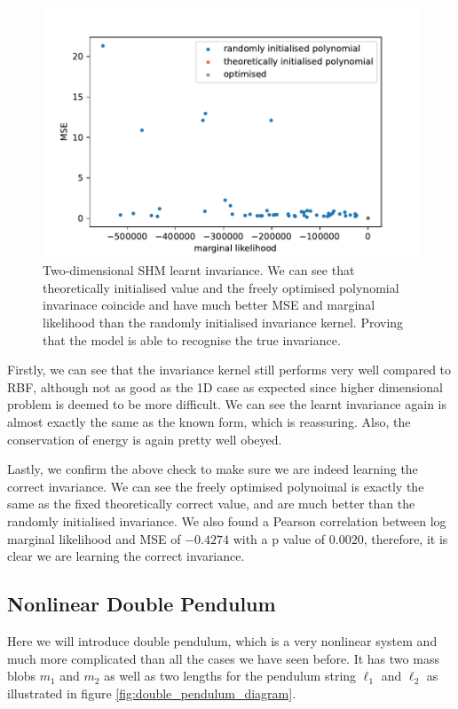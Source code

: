 \documentclass{statsmsc}
\begin{document}
\begin{figure}[H] 
  \includegraphics[width=0.8\linewidth]{../codes/figures/shm_2d_polynomial.pdf}
  \centering
  \caption{Two-dimensional SHM learnt invariance. We can see that theoretically initialised value and the freely optimised polynomial invarinace coincide and have much better MSE and marginal likelihood than the randomly initialised invariance kernel. Proving that the model is able to recognise the true invariance.}
  \label{fig:shm_2d_poly}
\end{figure}

Firstly, we can see that the invariance kernel still performs very well compared to RBF, although not as good as the 1D case as expected since higher dimensional problem is deemed to be more difficult.
We can see the learnt invariance again is almost exactly the same as the known form, which is reassuring.
Also, the conservation of energy is again pretty well obeyed.


Lastly, we confirm the above check to make sure we are indeed learning the correct invariance.
We can see the freely optimised polynoimal is exactly the same as the fixed theoretically correct value, and are much better than the randomly initialised invariance. 
We also found a Pearson correlation between log marginal likelihood and MSE of $-0.4274$ with a p value of $0.0020$, therefore, it is clear we are learning the correct invariance. 

\subsection{Nonlinear Double Pendulum}
Here we will introduce double pendulum, which is a very nonlinear system and much more complicated than all the cases we have seen before. 
It has two mass blobs $m_1$ and $m_2$ as well as two lengths for the pendulum string $\ell_1$ and $\ell_2$ as illustrated in figure \ref{fig:double_pendulum_diagram}.
\end{document}
